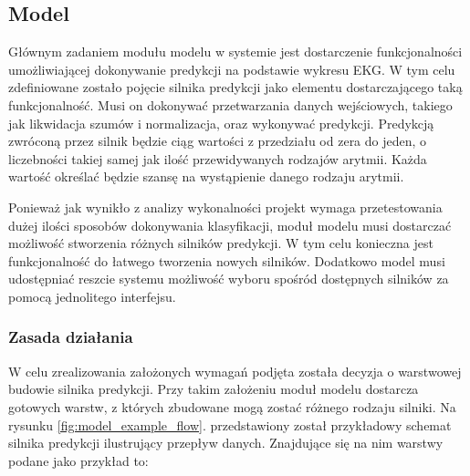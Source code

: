 \documentclass[polish,12pt]{aghthesis}
\begin{document}
\subsection{Model}

Głównym zadaniem modułu modelu w systemie jest dostarczenie funkcjonalności umożliwiającej dokonywanie predykcji na podstawie wykresu EKG. W tym celu zdefiniowane zostało pojęcie silnika predykcji jako elementu dostarczającego taką funkcjonalność. Musi on dokonywać przetwarzania danych wejściowych, takiego jak likwidacja szumów i normalizacja, oraz wykonywać predykcji. Predykcją zwróconą przez silnik będzie ciąg wartości z przedziału od zera do jeden, o liczebności takiej samej jak ilość przewidywanych rodzajów arytmii. Każda wartość określać będzie szansę na wystąpienie danego rodzaju arytmii.

Ponieważ jak wynikło z analizy wykonalności projekt wymaga przetestowania dużej ilości sposobów dokonywania klasyfikacji, moduł modelu musi dostarczać możliwość stworzenia różnych silników predykcji. W tym celu konieczna jest funkcjonalność do łatwego tworzenia nowych silników. Dodatkowo model musi udostępniać reszcie systemu możliwość wyboru spośród dostępnych silników za pomocą jednolitego interfejsu.

\subsubsection{Zasada działania}

W celu zrealizowania założonych wymagań podjęta została decyzja o warstwowej budowie silnika predykcji. Przy takim założeniu moduł modelu dostarcza gotowych warstw, z których zbudowane mogą zostać różnego rodzaju silniki.  Na rysunku \ref{fig:model_example_flow}. przedstawiony został przykładowy schemat silnika predykcji ilustrujący przepływ danych. Znajdujące się na nim warstwy podane jako przykład to:
\end{document}
